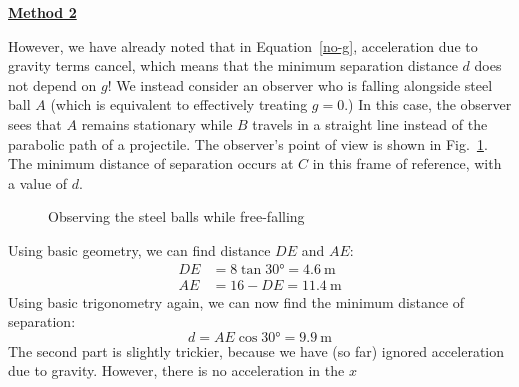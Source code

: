\documentclass[11pt]{article}
\begin{document}
\textbf{\underline{Method 2}}

However, we have already noted that in Equation~\ref{no-g}, acceleration due to
gravity terms cancel, which means that the minimum separation distance $d$ does
not depend on $g$! We instead consider an observer who is falling alongside
steel ball $A$ (which is equivalent to effectively treating $g=0$.) In this
case, the observer sees that $A$ remains stationary while $B$ travels in a
straight line instead of the parabolic path of a projectile. The observer's
point of view is shown in Fig.~\ref{falling}. The minimum distance of
separation occurs at $C$ in this frame of reference, with a value of $d$.
\begin{figure}[ht]
  \begin{center}
  \end{center}
  \caption{Observing the steel balls while free-falling}
  \label{falling}
\end{figure}
 Using basic geometry, we can find distance $DE$ and $AE$:
 \begin{align*}
   DE&=8\tan\ang{30}=\SI{4.6}{\metre}\\
   AE&=16-DE=\SI{11.4}{\metre}
 \end{align*}
Using basic trigonometry again, we can now find the minimum distance of
separation:
\begin{displaymath}
  d=AE\cos\ang{30}=\boxed{\SI{9.9}{\metre}}
\end{displaymath}
The second part is slightly trickier, because we have (so far) ignored
acceleration due to gravity. However, there is no acceleration in the $x$
\end{document}
